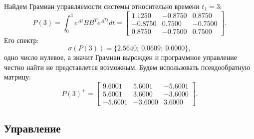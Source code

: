 Найдем Грамиан управляемости системы относительно времени $t_1=3$:
\begin{equation*}
    P(3)=\int_{0}^{3}e^{At}BB^Te^{A^Tt}dt=
    \begin{bmatrix}
        1.1250  & -0.8750   & 0.8750\\
        -0.8750  &  0.7500 &  -0.7500\\
         0.8750   &-0.7500&    0.7500
    \end{bmatrix}.
\end{equation*}
Его спектр:
\begin{equation*}
    \sigma(P(3))=\{ 2.5640;\ 
    0.0609;\ 
    0.0000\},
\end{equation*}
одно число нулевое, а значит Грамиан вырожден и программное управление честно найти не представлется
возможным. Будем использовать псевдообратную матрицу:
\begin{equation*}
    P(3)^+=\begin{bmatrix}
        9.6001&    5.6001  & -5.6001\\
        5.6001 &   3.6000 &  -3.6000\\
       -5.6001  & -3.6000&    3.6000
    \end{bmatrix}.
\end{equation*}

\subsection{Управление}


